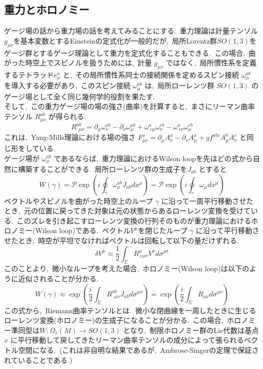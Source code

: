 \documentclass[uplatex,dvipdfmx]{jsarticle}
\begin{document}
\subsection{重力とホロノミー}
ゲージ場の話から重力場の話を考えてみることにする.~重力理論は計量テンソル$g_{\mu\nu}$を基本変数とするEinsteinの定式化が一般的だが,~局所Lorentz群$SO(1,3)$をゲージ群とするゲージ理論として重力を定式化することもできる.~この場合,~曲がった時空上でスピノルを扱うためには,~計量 $g_{\mu\nu}$ ではなく,~局所慣性系を定義するテトラッド$e^a_\mu$ と,~その局所慣性系同士の接続関係を定めるスピン接続 $\omega_\mu^{ab}$ を導入する必要があり,~このスピン接続 $\omega_\mu^{ab}$ は,~局所ローレンツ群 $SO(1,3)$ のゲージ場として全く同じ幾何学的役割を果たす.\\
そして,~この重力ゲージ場の場の強さ(曲率)を計算すると,~まさにリーマン曲率テンソル $R^{ab}_{\mu\nu}$ が得られる.
\begin{equation}
    R^{ab}_{\ \ \mu\nu} = \partial_\mu \omega^{ab}_\nu - \partial_\nu \omega^{ab}_\mu + \omega^a_{\ c\mu} \omega^{cb}_\nu - \omega^a_{\ c\nu} \omega^{cb}_\mu
\end{equation}
これは,~Yang-Mills理論における場の強さ $F_{\mu\nu}^a = \partial_\mu A_\nu^a - \partial_\nu A_\mu^a + g f^{abc} A_\mu^b A_\nu^c$ と同じ形をしている.\\
ゲージ場が $\omega_\mu^{ab}$ であるならば,~重力理論におけるWilson loopを先ほどの式から自然に構築することができる.~局所ローレンツ群の生成子を$J_{ab}$ とすると
\begin{equation}
    W(\gamma) = \mathcal{P} \exp \left( i \oint_\gamma \omega_\mu^{ab} J_{ab} dx^\mu \right) = \mathcal{P} \exp \left( i \oint_\gamma \omega_\mu dx^\mu \right)
\end{equation}
ベクトルやスピノルを曲がった時空上のループ $\gamma$ に沿って一周平行移動させたとき,~元の位置に戻ってきた対象は元の状態からあるローレンツ変換を受けている.~このズレを引き起こすローレンツ変換の行列そのものが重力理論におけるホロノミー(Wilson loop)である.~ベクトル$V^\mu$を閉じたループ $\gamma$ に沿って平行移動させたとき,~時空が平坦でなければベクトルは回転して以下の量だけずれる.
\begin{equation}
    \delta V^\mu \approx \frac{1}{2} \int_\Sigma R^\mu_{\ \nu\rho\sigma} V^\nu d\sigma^{\rho\sigma} 
\end{equation}
このことより,~微小なループを考えた場合,~ホロノミー(Wilson loop)は以下のように近似されることが分かる.
\begin{equation}
    W(\gamma) \approx \exp \left( \frac{i}{2} \int_\Sigma R^{ab}_{\ \ \mu\nu} J_{ab} d\sigma^{\mu\nu} \right) = \exp \left( \frac{i}{2} \int_\Sigma R_{\mu\nu} d\sigma^{\mu\nu} \right)
\end{equation}
この式から,~Riemann曲率テンソルとは.~微小な閉曲線を一周したときに生じるローレンツ変換(ホロノミー)の生成子になることが分かる.~この場合,~ホロノミー準同型は$W : \Omega_1(M) \to SO(1,3)$ となり,~制限ホロノミー群のLie代数は基点 $x$ に平行移動して戻してきたリーマン曲率テンソルの成分によって張られるベクトル空間になる.~(これは非自明な結果であるが,~Ambrose-Singerの定理で保証されていることである.)
\end{document}
